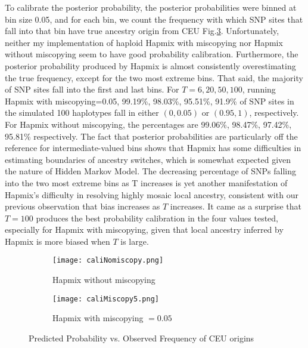 \documentclass{article}
\begin{document}
    To calibrate the posterior probability, the posterior probabilities were binned at bin size 0.05, and for each bin, we count the frequency with which SNP sites that fall into that bin have true ancestry origin from CEU Fig.\ref{fig:calibrate}. Unfortunately, neither my implementation of haploid Hapmix with miscopying nor Hapmix without miscopying seem to have good probability calibration. Furthermore, the posterior probability produced by Hapmix is almost consistently overestimating the true frequency, except for the two most extreme bins. That said, the majority of SNP sites fall into the first and last bins. For $T=6,20,50,100$, running Hapmix with miscopying=0.05, 99.19\%, 98.03\%, 95.51\%, 91.9\% of SNP sites in the simulated 100 haplotypes fall in either $(0,0.05)$ or $(0.95, 1)$, respectively. For Hapmix without miscopying, the percentages are 99.06\%, 98.47\%, 97.42\%, 95.81\% respectively. The fact that posterior probabilities are particularly off the reference for intermediate-valued bins shows that Hapmix has some difficulties in estimating boundaries of ancestry switches, which is somewhat expected given the nature of Hidden Markov Model. The decreasing percentage of SNPs falling into the two most extreme bins as T increases is yet another manifestation of Hapmix's difficulty in resolving highly mosaic local ancestry, consistent with our previous observation that bias increases as $T$ increases. It came as a surprise that $T=100$ produces the best probability calibration in the four values tested, especially for Hapmix with miscopying, given that local ancestry inferred by Hapmix is more biased when $T$ is large.
    
     \begin{figure}[H]
     \centering
     \begin{subfigure}[b]{0.45\textwidth}
         \centering
         \texttt{[image: caliNomiscopy.png]}
         \caption{Hapmix without miscopying}
         \label{fig:caliNomiscopy}
     \end{subfigure}
     \hfill
     \begin{subfigure}[b]{0.45\textwidth}
         \centering
         \texttt{[image: caliMiscopy5.png]}
         \caption{Hapmix with miscopying $=0.05$}
         \label{fig:caliMiscopy5}
     \end{subfigure}
        \caption{Predicted Probability vs. Observed Frequency of CEU origins}
        \label{fig:calibrate}
\end{figure}
    
\end{document}
